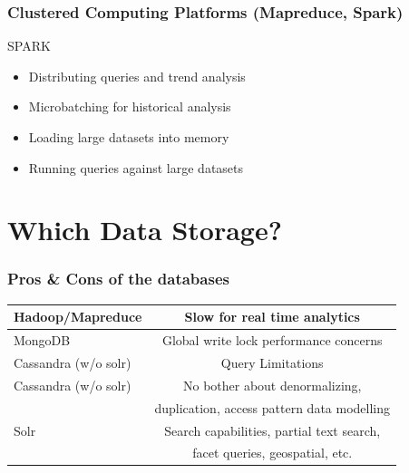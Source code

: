 \documentclass{beamer}
\begin{document}
\begin{frame}
\frametitle{Clustered Computing Platforms (Mapreduce, Spark)}
	SPARK
	\begin{itemize}
		\item Distributing queries and trend analysis
		\item Microbatching for historical analysis
		\item Loading large datasets into memory
		\item Running queries against large datasets
	\end{itemize}
\end{frame}


\section{Which Data Storage?}

\begin{frame}
\frametitle{Pros \& Cons of the databases}
	\begin{table}
		\begin{tabular}{l | c }
			\hline
			Hadoop/Mapreduce & Slow for real time analytics \\
			\hline 
			MongoDB & Global write lock performance concerns \\ 
			\hline 
			Cassandra (w/o solr) & Query Limitations \\
			\hline 
			Cassandra (w/o solr) & No bother about denormalizing, \\  & duplication, access pattern data modelling \\
			\hline 
			Solr & Search capabilities, partial text search, \\  & facet queries, geospatial, etc.\\
			\hline
		\end{tabular}
	\end{table}
\end{frame}
\end{document}
